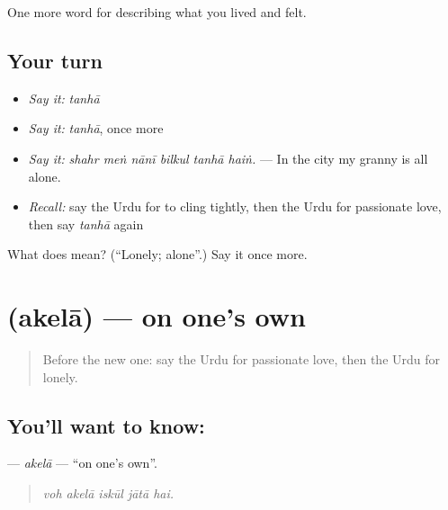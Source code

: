\begin{grammarlens}[title={What you've built}]
One more word for describing what you lived and felt.
\end{grammarlens}

\subsection*{Your turn}
\begin{itemize}
\raggedright
  \item \emph{Say it:} \emph{tanhā}
  \item \emph{Say it:} \emph{tanhā}, once more
  \item \emph{Say it:} \emph{shahr meṅ nānī bilkul tanhā haiṅ.} — In the city my granny is all alone.
  \item \emph{Recall:} say the Urdu for to cling tightly, then the Urdu for passionate love, then say \emph{tanhā} again
\end{itemize}

\begin{tcolorbox}[breakable,colback=teal!4,colframe=teal!35!black,title={Before you move on}]
What does  mean? (\textquotedblleft{}Lonely; alone\textquotedblright{}.) Say it once more.
\end{tcolorbox}
\section[\texorpdfstring{\ur{اکیلا} (akelā)}{اکیلا (akelā)}]{ (akelā) — on one's own}

\label{lesson:UR-C450-akela}



\begin{quote}
Before the new one: say the Urdu for passionate love, then the Urdu for lonely.
\end{quote}

\subsection*{You'll want to know: }
\textbf{} — \emph{akelā} — \textquotedblleft{}on one's own\textquotedblright{}.

\begin{quote}
    
\end{quote}

\begin{quote}
\emph{voh akelā iskūl jātā hai.}
\end{quote}

